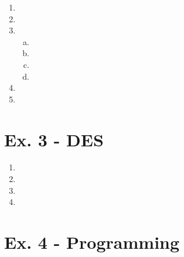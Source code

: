 \documentclass[11pt,a4paper]{article}
\begin{document}
\begin{enumerate}
	\item
	
	\item
	
	\item
	\begin{enumerate}[(a)]
		\item
		
		\item
		
		\item
		
		\item
		
	\end{enumerate}
	
	\item
	
	\item
	 
\end{enumerate}

\section*{Ex. 3 - DES}
\begin{enumerate}
	\item
	
	\item
	
	\item
	
	\item
\end{enumerate}

\section*{Ex. 4 - Programming}
\end{document}
